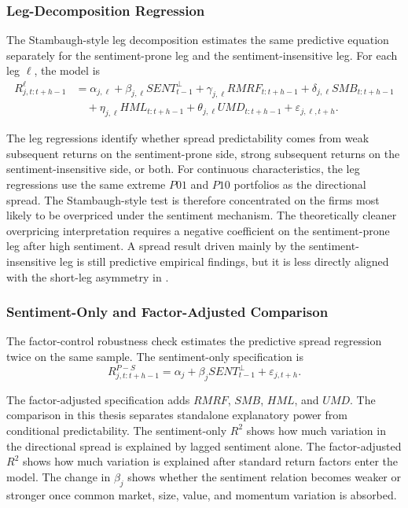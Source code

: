 \documentclass[11pt]{article}
\newcommand{\var}[1]{\ensuremath{#1}}
\begin{document}
\subsubsection{Leg-Decomposition Regression}
The Stambaugh-style leg decomposition estimates the same predictive equation separately for the sentiment-prone leg and the sentiment-insensitive leg. For each leg \var{\ell}, the model is
\begin{equation}
    \begin{aligned}
    R^{\ell}_{j,t:t+h-1}
    &=
    \alpha_{j,\ell}
    + \beta_{j,\ell} SENT^{\perp}_{t-1}
    + \gamma_{j,\ell} RMRF_{t:t+h-1}
    + \delta_{j,\ell} SMB_{t:t+h-1} \\
    &\quad
    + \eta_{j,\ell} HML_{t:t+h-1}
    + \theta_{j,\ell} UMD_{t:t+h-1}
    + \varepsilon_{j,\ell,t+h}.
    \end{aligned}
\end{equation}

The leg regressions identify whether spread predictability comes from weak subsequent returns on the sentiment-prone side, strong subsequent returns on the sentiment-insensitive side, or both. For continuous characteristics, the leg regressions use the same extreme \var{P01} and \var{P10} portfolios as the directional spread. The Stambaugh-style test is therefore concentrated on the firms most likely to be overpriced under the sentiment mechanism. The theoretically cleaner overpricing interpretation requires a negative coefficient on the sentiment-prone leg after high sentiment. A spread result driven mainly by the sentiment-insensitive leg is still predictive empirical findings, but it is less directly aligned with the short-leg asymmetry in \citet{stambaugh2012short}.

\subsubsection{Sentiment-Only and Factor-Adjusted Comparison}
The factor-control robustness check estimates the predictive spread regression twice on the same sample. The sentiment-only specification is
\begin{equation}
    R^{P-S}_{j,t:t+h-1}
    =
    \alpha_j
    + \beta_j SENT^{\perp}_{t-1}
    + \varepsilon_{j,t+h}.
\end{equation}

The factor-adjusted specification adds \var{RMRF}, \var{SMB}, \var{HML}, and \var{UMD}. The comparison in this thesis separates standalone explanatory power from conditional predictability. The sentiment-only \var{R^2} shows how much variation in the directional spread is explained by lagged sentiment alone. The factor-adjusted \var{R^2} shows how much variation is explained after standard return factors enter the model. The change in \var{\beta_j} shows whether the sentiment relation becomes weaker or stronger once common market, size, value, and momentum variation is absorbed.
\end{document}
